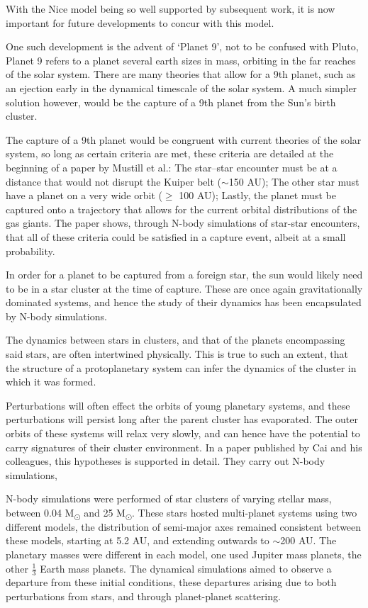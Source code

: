 \documentclass[a4paper,10pt]{article}
\begin{document}
With the Nice model being so well supported by subsequent work, it is now important for future developments to concur with this model. 

One such development is the advent of `Planet 9', not to be confused with Pluto, Planet 9 refers to a planet several earth sizes in mass, orbiting in the far reaches of the solar system. There are many theories that allow for a 9th planet, such as an ejection early in the dynamical timescale of the solar system. A much simpler solution however, would be the capture of a 9th planet from the Sun's birth cluster.  

The capture of a 9th planet would be congruent with current theories of the solar system, so long as certain criteria are met, these criteria are detailed at the beginning of a paper by Mustill et al.\cite{Planet 9}: The star--star encounter must be at a distance that would not disrupt the Kuiper belt ($\sim$150 AU); The other star must have a planet on a very wide orbit ($\geq$ 100 AU); Lastly, the planet must be captured onto a trajectory that allows for the current orbital distributions of the gas giants. The paper shows, through N-body simulations of star-star encounters, that all of these criteria could be satisfied in a capture event, albeit at a small probability. 

In order for a planet to be captured from a foreign star, the sun would likely need to be in a star cluster at the time of capture. These are once again gravitationally dominated systems, and hence the study of their dynamics has been encapsulated by N-body simulations.

The dynamics between stars in clusters, and that of the planets encompassing said stars, are often intertwined physically. This is true to such an extent, that the structure of a protoplanetary system can infer the dynamics of the cluster in which it was formed. 

Perturbations will often effect the orbits of young planetary systems, and these perturbations will persist long after the parent cluster has evaporated. The outer orbits of these systems will relax very slowly, and can hence have the potential to carry signatures of their cluster environment. In a paper published by Cai and his colleagues, this hypotheses is supported in detail\cite{Signatures}. They carry out N-body simulations, 

N-body simulations were performed of star clusters of varying stellar mass, between 0.04 M\textsubscript{\(\odot\)} and 25 M\textsubscript{\(\odot\)}. These stars hosted multi-planet systems using two different models, the distribution of semi-major axes remained consistent between these models, starting at 5.2 AU, and extending outwards to $\sim$200 AU. The planetary masses were different in each model, one used Jupiter mass planets, the other $\frac{1}{3}$ Earth mass planets. The dynamical simulations aimed to observe a departure from these initial conditions, these departures arising due to both perturbations from stars, and through planet-planet scattering.
\end{document}

